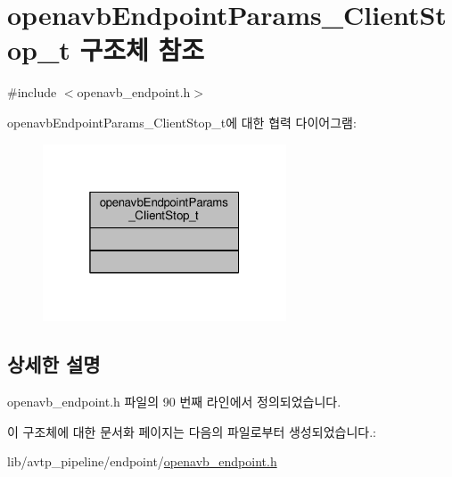 \hypertarget{structopenavb_endpoint_params___client_stop__t}{}\section{openavb\+Endpoint\+Params\+\_\+\+Client\+Stop\+\_\+t 구조체 참조}
\label{structopenavb_endpoint_params___client_stop__t}


{\ttfamily \#include $<$openavb\+\_\+endpoint.\+h$>$}



openavb\+Endpoint\+Params\+\_\+\+Client\+Stop\+\_\+t에 대한 협력 다이어그램\+:
\nopagebreak
\begin{figure}[H]
\begin{center}
\leavevmode
\includegraphics[width=205pt]{structopenavb_endpoint_params___client_stop__t__coll__graph}
\end{center}
\end{figure}


\subsection{상세한 설명}


openavb\+\_\+endpoint.\+h 파일의 90 번째 라인에서 정의되었습니다.



이 구조체에 대한 문서화 페이지는 다음의 파일로부터 생성되었습니다.\+:\begin{DoxyCompactItemize}
\item 
lib/avtp\+\_\+pipeline/endpoint/\hyperlink{openavb__endpoint_8h}{openavb\+\_\+endpoint.\+h}\end{DoxyCompactItemize}
